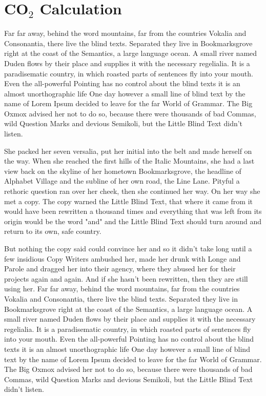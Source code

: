 
\chapter{CO$_\text{2}$ Calculation}

Far far away, behind the word mountains, far from the countries Vokalia and Consonantia, there live the blind texts. Separated they live in Bookmarksgrove right at the coast of the Semantics, a large language ocean. A small river named Duden flows by their place and supplies it with the necessary regelialia. It is a paradisematic country, in which roasted parts of sentences fly into your mouth. Even the all-powerful Pointing has no control about the blind texts it is an almost unorthographic life One day however a small line of blind text by the name of Lorem Ipsum decided to leave for the far World of Grammar. The Big Oxmox advised her not to do so, because there were thousands of bad Commas, wild Question Marks and devious Semikoli, but the Little Blind Text didn’t listen.

She packed her seven versalia, put her initial into the belt and made herself on the way. When she reached the first hills of the Italic Mountains, she had a last view back on the skyline of her hometown Bookmarksgrove, the headline of Alphabet Village and the subline of her own road, the Line Lane. Pityful a rethoric question ran over her cheek, then she continued her way. On her way she met a copy. The copy warned the Little Blind Text, that where it came from it would have been rewritten a thousand times and everything that was left from its origin would be the word "and" and the Little Blind Text should turn around and return to its own, safe country.

But nothing the copy said could convince her and so it didn’t take long until a few insidious Copy Writers ambushed her, made her drunk with Longe and Parole and dragged her into their agency, where they abused her for their projects again and again. And if she hasn’t been rewritten, then they are still using her. Far far away, behind the word mountains, far from the countries Vokalia and Consonantia, there live the blind texts. Separated they live in Bookmarksgrove right at the coast of the Semantics, a large language ocean. A small river named Duden flows by their place and supplies it with the necessary regelialia. It is a paradisematic country, in which roasted parts of sentences fly into your mouth. Even the all-powerful Pointing has no control about the blind texts it is an almost unorthographic life One day however a small line of blind text by the name of Lorem Ipsum decided to leave for the far World of Grammar. The Big Oxmox advised her not to do so, because there were thousands of bad Commas, wild Question Marks and devious Semikoli, but the Little Blind Text didn’t listen.